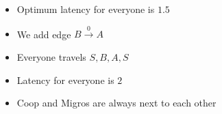 \begin{itemize}
\begin{itemize}
\begin{itemize}
\begin{itemize}
                        \end{itemize}
                     \item Optimum latency for everyone is $1.5$
                     \item We add edge $B \overset{0}{\to} A$
                     \item Everyone travels $S, B, A, S$
                     \item Latency for everyone is $2$
                \end{itemize}
                \begin{itemize}
                    \item Coop and Migros are always next to each other
                \end{itemize}
        \end{itemize}
\end{itemize}

